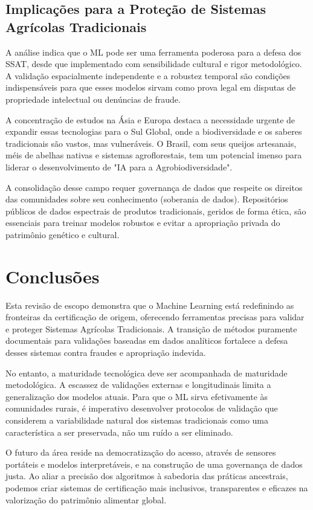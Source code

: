 \subsection{Implicações para a Proteção de Sistemas Agrícolas Tradicionais}

A análise indica que o ML pode ser uma ferramenta poderosa para a defesa dos SSAT, desde que implementado com sensibilidade cultural e rigor metodológico. A validação espacialmente independente e a robustez temporal são condições indispensáveis para que esses modelos sirvam como prova legal em disputas de propriedade intelectual ou denúncias de fraude.

A concentração de estudos na Ásia e Europa destaca a necessidade urgente de expandir essas tecnologias para o Sul Global, onde a biodiversidade e os saberes tradicionais são vastos, mas vulneráveis. O Brasil, com seus queijos artesanais, méis de abelhas nativas e sistemas agroflorestais, tem um potencial imenso para liderar o desenvolvimento de "IA para a Agrobiodiversidade".

A consolidação desse campo requer governança de dados que respeite os direitos das comunidades sobre seu conhecimento (soberania de dados). Repositórios públicos de dados espectrais de produtos tradicionais, geridos de forma ética, são essenciais para treinar modelos robustos e evitar a apropriação privada do patrimônio genético e cultural.

\section{Conclusões}

Esta revisão de escopo demonstra que o Machine Learning está redefinindo as fronteiras da certificação de origem, oferecendo ferramentas precisas para validar e proteger Sistemas Agrícolas Tradicionais. A transição de métodos puramente documentais para validações baseadas em dados analíticos fortalece a defesa desses sistemas contra fraudes e apropriação indevida.

No entanto, a maturidade tecnológica deve ser acompanhada de maturidade metodológica. A escassez de validações externas e longitudinais limita a generalização dos modelos atuais. Para que o ML sirva efetivamente às comunidades rurais, é imperativo desenvolver protocolos de validação que considerem a variabilidade natural dos sistemas tradicionais como uma característica a ser preservada, não um ruído a ser eliminado.

O futuro da área reside na democratização do acesso, através de sensores portáteis e modelos interpretáveis, e na construção de uma governança de dados justa. Ao aliar a precisão dos algoritmos à sabedoria das práticas ancestrais, podemos criar sistemas de certificação mais inclusivos, transparentes e eficazes na valorização do patrimônio alimentar global.

\newpage

